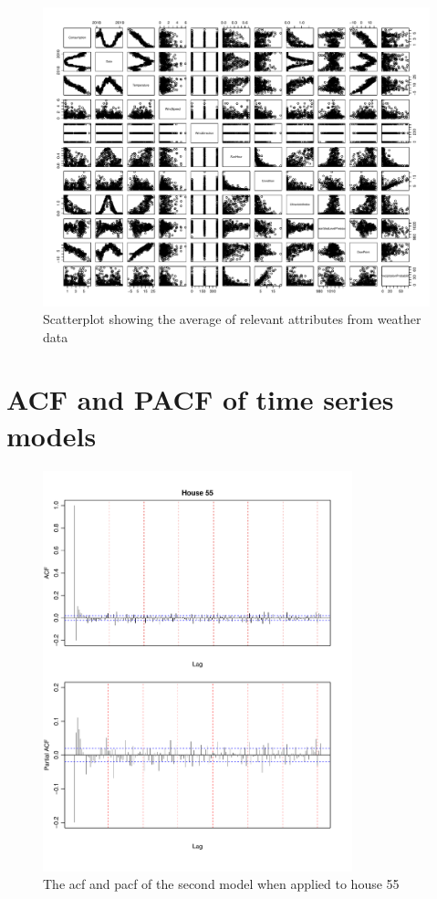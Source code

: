 \begin{figure}[H]
    \centering
    \includegraphics[width=1.3\textwidth, angle = 90]{../../../figures/weather_cons.pdf}
    \caption{Scatterplot showing the average of relevant attributes from weather data}
    \label{fig: weather_cons}
\end{figure}

\section{ACF and PACF of time series models}
\begin{figure}[H]
    \centering
    \includegraphics[width=0.8\textwidth]{../../../figures/arimax/ACF_55_long.pdf}
    \caption{The acf and pacf of the second model when applied to house 55}
    \label{fig:Model2_acf_55_long}
\end{figure}    


